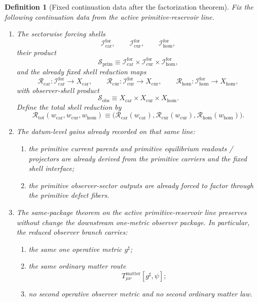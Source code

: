 \documentclass[11pt]{article}
\newcommand{\CompletedMetric}{g^{\sharp}}
\newcommand{\Car}{\mathrm{car}}
\newcommand{\Cur}{\mathrm{cur}}
\newcommand{\Hom}{\mathrm{hom}}
\newcommand{\ForSpace}[1]{\mathcal I_{#1}^{\mathrm{for}}}
\newcommand{\Reduction}[1]{\mathcal R_{#1}}
\newcommand{\ReductionTriple}{\mathcal R_{\mathrm{tot}}}
\newcommand{\PrimShell}{\mathcal S_{\mathrm{prim}}}
\newcommand{\ObsShell}{\mathcal S_{\mathrm{obs}}}
\newtheorem{definition}{Definition}
\begin{document}
\begin{definition}[Fixed continuation data after the factorization theorem]
\label{def:fixed}
Fix the following continuation data from the active primitive-reservoir line.
\begin{enumerate}
    \item The sectorwise forcing shells
    \[
    \ForSpace{\Car},\qquad
    \ForSpace{\Cur},\qquad
    \ForSpace{\Hom},
    \]
    their product
    \[
    \PrimShell
    \equiv
    \ForSpace{\Car}\times\ForSpace{\Cur}\times\ForSpace{\Hom},
    \]
    and the already fixed shell reduction maps
    \[
    \Reduction{\Car}:\ForSpace{\Car}\to X_{\Car},\qquad
    \Reduction{\Cur}:\ForSpace{\Cur}\to X_{\Cur},\qquad
    \Reduction{\Hom}:\ForSpace{\Hom}\to X_{\Hom},
    \]
    with observer-shell product
    \[
    \ObsShell
    \equiv
    X_{\Car}\times X_{\Cur}\times X_{\Hom}.
    \]
    Define the total shell reduction by
    \[
    \ReductionTriple(w_{\Car},w_{\Cur},w_{\Hom})
    \equiv
    \bigl(
    \Reduction{\Car}(w_{\Car}),
    \Reduction{\Cur}(w_{\Cur}),
    \Reduction{\Hom}(w_{\Hom})
    \bigr).
    \]
    \item The datum-level gains already recorded on that same line:
    \begin{enumerate}
        \item the primitive current parents and primitive equilibrium readouts / projectors are already derived from the primitive carriers and the fixed shell interface;
        \item the primitive observer-sector outputs are already forced to factor through the primitive defect fibers.
    \end{enumerate}
    \item The same-package theorem on the active primitive-reservoir line preserves without change the downstream one-metric observer package. In particular, the reduced observer branch carries:
    \begin{enumerate}
        \item the same one operative metric \(\CompletedMetric\);
        \item the same ordinary matter route
        \[
        T_{\mu\nu}^{\mathrm{matter}}[\CompletedMetric,\psi];
        \]
        \item no second operative observer metric and no second ordinary matter law.
    \end{enumerate}
\end{enumerate}
\end{definition}
\end{document}
